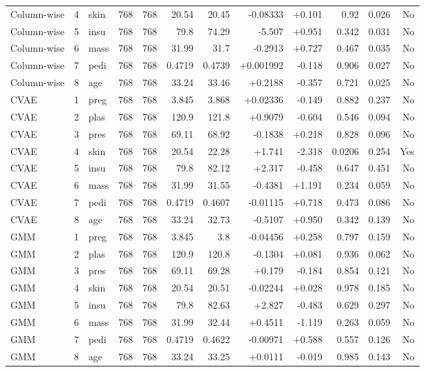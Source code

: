\begin{landscape}
\begin{longtable}{@{}lrp{4.0cm}rrrrrrrrr@{}}
Column-wise & 4 & skin & 768 & 768 & 20.54 & 20.45 & -0.08333 & +0.101 & 0.92 & 0.026 & No \\
Column-wise & 5 & insu & 768 & 768 & 79.8 & 74.29 & -5.507 & +0.951 & 0.342 & 0.031 & No \\
Column-wise & 6 & mass & 768 & 768 & 31.99 & 31.7 & -0.2913 & +0.727 & 0.467 & 0.035 & No \\
Column-wise & 7 & pedi & 768 & 768 & 0.4719 & 0.4739 & +0.001992 & -0.118 & 0.906 & 0.027 & No \\
Column-wise & 8 & age & 768 & 768 & 33.24 & 33.46 & +0.2188 & -0.357 & 0.721 & 0.025 & No \\
CVAE & 1 & preg & 768 & 768 & 3.845 & 3.868 & +0.02336 & -0.149 & 0.882 & 0.237 & No \\
CVAE & 2 & plas & 768 & 768 & 120.9 & 121.8 & +0.9079 & -0.604 & 0.546 & 0.094 & No \\
CVAE & 3 & pres & 768 & 768 & 69.11 & 68.92 & -0.1838 & +0.218 & 0.828 & 0.096 & No \\
CVAE & 4 & skin & 768 & 768 & 20.54 & 22.28 & +1.741 & -2.318 & 0.0206 & 0.254 & Yes \\
CVAE & 5 & insu & 768 & 768 & 79.8 & 82.12 & +2.317 & -0.458 & 0.647 & 0.451 & No \\
CVAE & 6 & mass & 768 & 768 & 31.99 & 31.55 & -0.4381 & +1.191 & 0.234 & 0.059 & No \\
CVAE & 7 & pedi & 768 & 768 & 0.4719 & 0.4607 & -0.01115 & +0.718 & 0.473 & 0.086 & No \\
CVAE & 8 & age & 768 & 768 & 33.24 & 32.73 & -0.5107 & +0.950 & 0.342 & 0.139 & No \\
GMM & 1 & preg & 768 & 768 & 3.845 & 3.8 & -0.04456 & +0.258 & 0.797 & 0.159 & No \\
GMM & 2 & plas & 768 & 768 & 120.9 & 120.8 & -0.1304 & +0.081 & 0.936 & 0.062 & No \\
GMM & 3 & pres & 768 & 768 & 69.11 & 69.28 & +0.179 & -0.184 & 0.854 & 0.121 & No \\
GMM & 4 & skin & 768 & 768 & 20.54 & 20.51 & -0.02244 & +0.028 & 0.978 & 0.185 & No \\
GMM & 5 & insu & 768 & 768 & 79.8 & 82.63 & +2.827 & -0.483 & 0.629 & 0.297 & No \\
GMM & 6 & mass & 768 & 768 & 31.99 & 32.44 & +0.4511 & -1.119 & 0.263 & 0.059 & No \\
GMM & 7 & pedi & 768 & 768 & 0.4719 & 0.4622 & -0.00971 & +0.588 & 0.557 & 0.126 & No \\
GMM & 8 & age & 768 & 768 & 33.24 & 33.25 & +0.0111 & -0.019 & 0.985 & 0.143 & No \\
\end{longtable}
\endgroup
\end{landscape}
